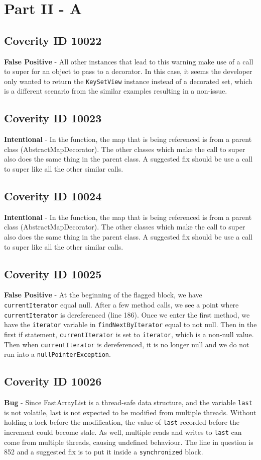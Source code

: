 \documentclass[12pt]{article}
\begin{document}
\section{Part II - A}
\subsection{Coverity ID 10022}
\textbf{False Positive} - All other instances that lead to this warning make use of a call to super for an object to pass to a decorator. In this case, it seems the developer only wanted to return the \texttt{KeySetView} instance instead of a decorated set, which is a different scenario from the similar examples resulting in a non-issue.
\subsection{Coverity ID 10023}
\textbf{Intentional} - In the function, the map that is being referenced is from a parent class (AbstractMapDecorator). The other classes which make the call to super also does the same thing in the parent class. A suggested fix should be use a call to super like all the other similar calls.
\subsection{Coverity ID 10024}
\textbf{Intentional} - In the function, the map that is being referenced is from a parent class (AbstractMapDecorator). The other classes which make the call to super also does the same thing in the parent class. A suggested fix should be use a call to super like all the other similar calls.
\subsection{Coverity ID 10025}
\textbf{False Positive} - At the beginning of the flagged block, we have \texttt{currentIterator} equal null. After a few method calls, we see a point where \texttt{currentIterator} is dereferenced (line 186). Once we enter the first method, we have the \texttt{iterator} variable in \texttt{findNextByIterator} equal to not null. Then in the first if statement, \texttt{currentIterator} is set to \texttt{iterator}, which is a non-null value. Then when \texttt{currentIterator} is dereferenced, it is no longer null and we do not run into a \texttt{nullPointerException}.
\subsection{Coverity ID 10026}
\textbf{Bug} - Since FastArrayList is a thread-safe data structure, and the variable \texttt{last} is not volatile, last is not expected to be modified from multiple threads. Without holding a lock before the modification, the value of \texttt{last} recorded before the increment could become stale. As well, multiple reads and writes to \texttt{last} can come from multiple threads, causing undefined behaviour. The line in question is 852 and a suggested fix is to put it inside a \texttt{synchronized} block.
\end{document}
